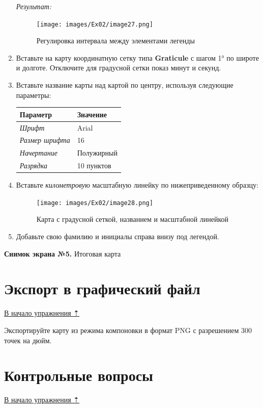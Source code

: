 \documentclass[12pt,]{book}
\begin{document}
\begin{enumerate}
  \emph{Результат:}

  \begin{figure}
  \centering
  \texttt{[image: images/Ex02/image27.png]}
  \caption{Регулировка интервала между элементами легенды}
  \end{figure}
\item
  Вставьте на карту координатную сетку типа \textbf{Graticule} с шагом 1° по широте и долготе. Отключите для градусной сетки показ минут и секунд.
\item
  Вставьте название карты над картой по центру, используя следующие параметры:

  \begin{longtable}[]{@{}ll@{}}
  \toprule
  Параметр & Значение\tabularnewline
  \midrule
  \endhead
  \emph{Шрифт} & Arial\tabularnewline
  \emph{Размер шрифта} & 16\tabularnewline
  \emph{Начертание} & Полужирный\tabularnewline
  \emph{Разрядка} & 10 пунктов\tabularnewline
  \bottomrule
  \end{longtable}
\item
  Вставьте \emph{километровую} масштабную линейку по нижеприведенному образцу:

  \begin{figure}
  \centering
  \texttt{[image: images/Ex02/image28.png]}
  \caption{Карта с градусной сеткой, названием и масштабной линейкой}
  \end{figure}
\item
  Добавьте свою фамилию и инициалы справа внизу под легендой.
\end{enumerate}

\textbf{Снимок экрана №5.} Итоговая карта

\hypertarget{map-design-general-export}{%
\section{Экспорт в графический файл}\label{map-design-general-export}}

\protect\hyperlink{map-design-general}{В начало упражнения ⇡}

Экспортируйте карту из режима компоновки в формат PNG с разрешением 300 точек на дюйм.

\hypertarget{map-design-general-questions}{%
\section{Контрольные вопросы}\label{map-design-general-questions}}

\protect\hyperlink{map-design-general}{В начало упражнения ⇡}
\end{document}

